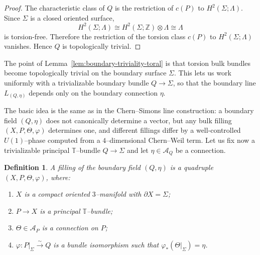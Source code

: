 \documentclass[12pt]{amsart}
\numberwithin{equation}{section}
\newtheorem{definition}[theorem]{Definition}
\begin{document}
\begin{proof}
The characteristic class of $Q$ is the restriction of $c(P)$ to
$H^2(\Sigma;\Lambda)$. Since $\Sigma$ is a closed oriented surface,
\[
H^2(\Sigma;\Lambda)\cong H^2(\Sigma;\mathbb Z)\otimes \Lambda\cong \Lambda
\]
is torsion-free. Therefore the restriction of the torsion class $c(P)$ to
$H^2(\Sigma;\Lambda)$ vanishes. Hence $Q$ is topologically trivial.
\end{proof}

The point of Lemma~\ref{lem:boundary-triviality-toral} is that torsion bulk bundles become topologically trivial on the boundary surface \(\Sigma\). This
lets us work uniformly with a trivializable boundary bundle \(Q\to\Sigma\), so
that the boundary line \(L_{(Q,\eta)}\) depends only on the boundary connection
\(\eta\).

The basic idea is the same as in the Chern--Simons line construction: a boundary
field \((Q,\eta)\) does not canonically determine a vector, but any bulk filling
\((X,P,\Theta,\varphi)\) determines one, and different fillings differ by a
well-controlled \(U(1)\)--phase computed from a \(4\)--dimensional Chern--Weil term. Let us fix now a trivializable principal $\mathbb T$--bundle $Q\to\Sigma$ and let
$\eta\in \mathcal A_Q$ be a connection.

\begin{definition}
\label{def:filling-boundary-field}
A \emph{filling} of the boundary field $(Q,\eta)$ is a quadruple $(X,P,\Theta,\varphi)$,
where:
\begin{enumerate}
\item[\textup{(i)}] $X$ is a compact oriented $3$--manifold with $\partial X=\Sigma$;
\item[\textup{(ii)}] $P\to X$ is a principal $\mathbb T$--bundle;
\item[\textup{(iii)}] $\Theta\in\mathcal A_P$ is a connection on $P$;
\item[\textup{(iv)}] $\varphi:P|_\Sigma\xrightarrow{\sim}Q$ is a bundle isomorphism such that
$\varphi_*(\Theta|_\Sigma)=\eta$.
\end{enumerate}
\end{definition}
\end{document}
